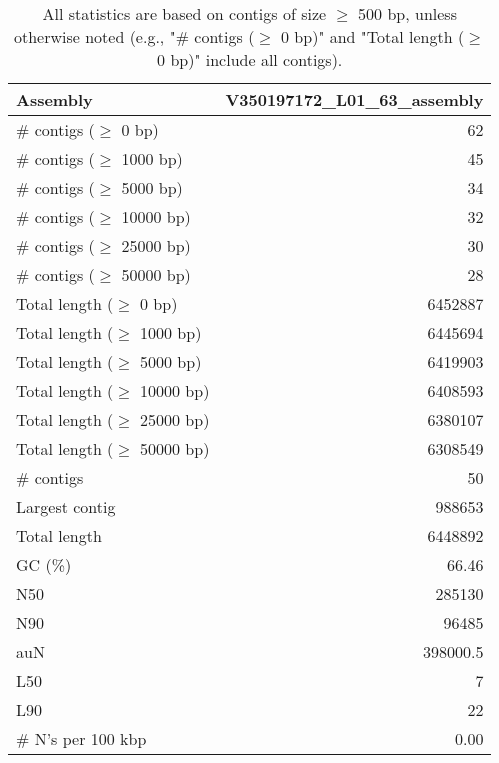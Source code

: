 \documentclass[12pt,a4paper]{article}
\begin{document}
\begin{table}[ht]
\begin{center}
\caption{All statistics are based on contigs of size $\geq$ 500 bp, unless otherwise noted (e.g., "\# contigs ($\geq$ 0 bp)" and "Total length ($\geq$ 0 bp)" include all contigs).}
\begin{tabular}{|l*{1}{|r}|}
\hline
Assembly & V350197172\_L01\_63\_assembly \\ \hline
\# contigs ($\geq$ 0 bp) & 62 \\ \hline
\# contigs ($\geq$ 1000 bp) & 45 \\ \hline
\# contigs ($\geq$ 5000 bp) & 34 \\ \hline
\# contigs ($\geq$ 10000 bp) & 32 \\ \hline
\# contigs ($\geq$ 25000 bp) & 30 \\ \hline
\# contigs ($\geq$ 50000 bp) & 28 \\ \hline
Total length ($\geq$ 0 bp) & 6452887 \\ \hline
Total length ($\geq$ 1000 bp) & 6445694 \\ \hline
Total length ($\geq$ 5000 bp) & 6419903 \\ \hline
Total length ($\geq$ 10000 bp) & 6408593 \\ \hline
Total length ($\geq$ 25000 bp) & 6380107 \\ \hline
Total length ($\geq$ 50000 bp) & 6308549 \\ \hline
\# contigs & 50 \\ \hline
Largest contig & 988653 \\ \hline
Total length & 6448892 \\ \hline
GC (\%) & 66.46 \\ \hline
N50 & 285130 \\ \hline
N90 & 96485 \\ \hline
auN & 398000.5 \\ \hline
L50 & 7 \\ \hline
L90 & 22 \\ \hline
\# N's per 100 kbp & 0.00 \\ \hline
\end{tabular}
\end{center}
\end{table}
\end{document}
